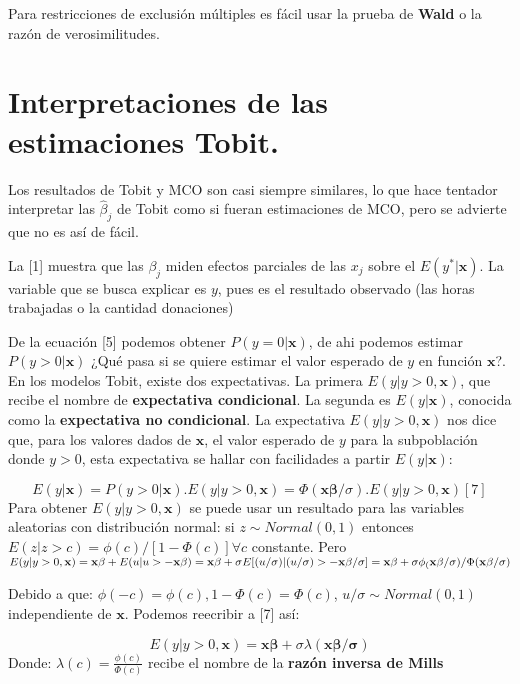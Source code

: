 \documentclass[
  letterpaper,
  DIV=11,
  numbers=noendperiod]{scrreprt}
\begin{document}
Para restricciones de exclusión múltiples es fácil usar la prueba de
\textbf{Wald} o la razón de verosimilitudes.

\section{Interpretaciones de las estimaciones
Tobit.}\label{interpretaciones-de-las-estimaciones-tobit.}

Los resultados de Tobit y MCO son casi siempre similares, lo que hace
tentador interpretar las \(\widehat{\beta}_j\) de Tobit como si fueran
estimaciones de MCO, pero se advierte que no es así de fácil.

La {[}1{]} muestra que las \(\beta_j\) miden efectos parciales de las
\(x_j\) sobre el \(E(y^*|\mathbf{x})\). La variable que se busca
explicar es \(y\), pues es el resultado observado (las horas trabajadas
o la cantidad donaciones)

De la ecuación {[}5{]} podemos obtener \(P(y=0|\mathbf{x})\), de ahi
podemos estimar \(P(y>0|\mathbf{x})\) ¿Qué pasa si se quiere estimar el
valor esperado de \(y\) en función \(\mathbf{x}\)?. En los modelos
Tobit, existe dos expectativas. La primera \(E(y|y>0,\mathbf{x})\), que
recibe el nombre de \textbf{expectativa condicional}. La segunda es
\(E(y|\mathbf{x})\), conocida como la \textbf{expectativa no
condicional}. La expectativa \(E(y|y>0,\mathbf{x})\) nos dice que, para
los valores dados de \(\mathbf{x}\), el valor esperado de \(y\) para la
subpoblación donde \(y>0\), esta expectativa se hallar con facilidades a
partir \(E(y|\mathbf{x})\):

\[E(y|\mathbf{x})=P(y>0|\mathbf{x}).E(y|y>0,\mathbf{x})=\Phi(\mathbf{x\beta}/\sigma).E(y|y>0,\mathbf{x}) [7]\]
Para obtener \(E(y|y>0,\mathbf{x})\) se puede usar un resultado para las
variables aleatorias con distribución normal: si \(z\sim Normal(0,1)\)
entonces \(E(z|z>c)=\phi(c)/[1-\Phi(c)] \forall c\) constante. Pero
\(E(y|y>0,\mathbf{x})=\mathbf{x\beta}+E(u|u>-\mathbf{x\beta})=\\\mathbf{x\beta}+\sigma E[(u/\sigma)|(u/\sigma)>-\mathbf{x\beta/\sigma}]=\\\mathbf{x\beta}+\sigma\phi_(\mathbf{x\beta}/\sigma)/\Phi(\mathbf{x\beta}/\sigma)\)

Debido a que: \(\phi(-c)=\phi(c), 1-\Phi(c)=\Phi(c)\),
\(u/\sigma\sim Normal (0,1)\) independiente de \(\mathbf{x}\). Podemos
reecribir a {[}7{]} así:

\[E(y|y>0,\mathbf{x})=\mathbf{x\beta}+\sigma\lambda(\mathbf{x\beta/\sigma})\]
Donde: \(\lambda(c)=\frac{\phi(c)}{\Phi(c)}\) recibe el nombre de la
\textbf{razón inversa de Mills}
\end{document}
